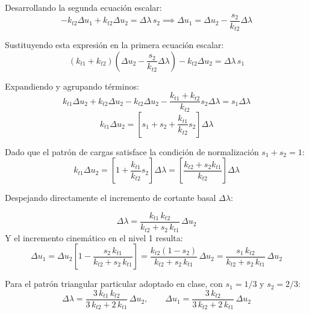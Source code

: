 \documentclass[11pt,letterpaper]{article}
\begin{document}
Desarrollando la segunda ecuación escalar:
\begin{equation}
    -k_{t2} \Delta u_1 + k_{t2} \Delta u_2 = \Delta \lambda \, s_2 \implies \Delta u_1 = \Delta u_2 - \frac{s_2}{k_{t2}} \Delta \lambda
\end{equation}

Sustituyendo esta expresión en la primera ecuación escalar:
\begin{equation}
    (k_{t1} + k_{t2}) \left( \Delta u_2 - \frac{s_2}{k_{t2}} \Delta \lambda \right) - k_{t2} \Delta u_2 = \Delta \lambda \, s_1
\end{equation}

Expandiendo y agrupando términos:
\begin{equation}
    k_{t1} \Delta u_2 + k_{t2} \Delta u_2 - k_{t2} \Delta u_2 - \frac{k_{t1} + k_{t2}}{k_{t2}} s_2 \Delta \lambda = s_1 \Delta \lambda
\end{equation}
\begin{equation}
    k_{t1} \Delta u_2 = \left[ s_1 + s_2 + \frac{k_{t1}}{k_{t2}} s_2 \right] \Delta \lambda
\end{equation}

Dado que el patrón de cargas satisface la condición de normalización $s_1 + s_2 = 1$:
\begin{equation}
    k_{t1} \Delta u_2 = \left[ 1 + \frac{k_{t1}}{k_{t2}} s_2 \right] \Delta \lambda = \left[ \frac{k_{t2} + s_2 k_{t1}}{k_{t2}} \right] \Delta \lambda
\end{equation}

Despejando directamente el incremento de cortante basal $\Delta \lambda$:
\begin{conceptbox}
\begin{equation}
    \label{eq:delta_lambda_analitico}
    \Delta \lambda = \frac{k_{t1} \, k_{t2}}{k_{t2} + s_2 \, k_{t1}} \, \Delta u_2
\end{equation}
Y el incremento cinemático en el nivel 1 resulta:
\begin{equation}
    \label{eq:delta_u1_analitico}
    \Delta u_1 = \Delta u_2 \left[ 1 - \frac{s_2 \, k_{t1}}{k_{t2} + s_2 \, k_{t1}} \right] = \frac{k_{t2} (1 - s_2)}{k_{t2} + s_2 \, k_{t1}} \, \Delta u_2 = \frac{s_1 \, k_{t2}}{k_{t2} + s_2 \, k_{t1}} \, \Delta u_2
\end{equation}
\end{conceptbox}

Para el patrón triangular particular adoptado en clase, con $s_1 = 1/3$ y $s_2 = 2/3$:
\begin{equation}
    \label{eq:formulas_triangular}
    \Delta \lambda = \frac{3 \, k_{t1} \, k_{t2}}{3 \, k_{t2} + 2 \, k_{t1}} \, \Delta u_2, \qquad
    \Delta u_1 = \frac{3 \, k_{t2}}{3 \, k_{t2} + 2 \, k_{t1}} \, \Delta u_2
\end{equation}
\end{document}
